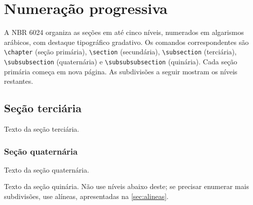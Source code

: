 \section{Numeração progressiva}\label{sec:numeracao}

A NBR 6024 \cite{abnt6024} organiza as seções em até cinco níveis, numerados em algarismos arábicos, com destaque tipográfico gradativo. Os comandos correspondentes são \verb|\chapter| (seção primária), \verb|\section| (secundária), \verb|\subsection| (terciária), \verb|\subsubsection| (quaternária) e \verb|\subsubsubsection| (quinária). Cada seção primária começa em nova página. As subdivisões a seguir mostram os níveis restantes.

\subsection{Seção terciária}\label{sec:terciaria}

Texto da seção terciária.

\subsubsection{Seção quaternária}\label{sec:quaternaria}

Texto da seção quaternária.

\label{sec:quinaria}

Texto da seção quinária. Não use níveis abaixo deste; se precisar enumerar mais subdivisões, use alíneas, apresentadas na \autoref{sec:alineas}.
